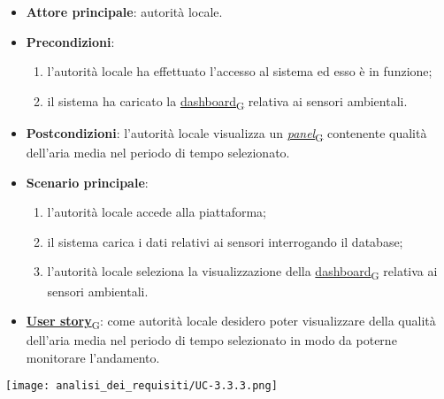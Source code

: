 \begin{itemize}
	\item \textbf{Attore principale}: autorità locale.
	\item \textbf{Precondizioni}:
	      \begin{enumerate}
		      \item l'autorità locale ha effettuato l'accesso al sistema ed esso è in funzione;
		      \item il sistema ha caricato la \href{https://7last.github.io/docs/pb/documentazione-interna/glossario\#dashboard}{dashboard\textsubscript{G}} relativa ai sensori ambientali.
	      \end{enumerate}
	\item \textbf{Postcondizioni}: l'autorità locale visualizza un \href{https://7last.github.io/docs/pb/documentazione-interna/glossario\#panel}{\textit{panel}\textsubscript{G}} contenente qualità dell'aria media nel periodo di tempo selezionato.
	\item \textbf{Scenario principale}:
	      \begin{enumerate}
		      \item l'autorità locale accede alla piattaforma;
		      \item il sistema carica i dati relativi ai sensori interrogando il database;
		      \item l'autorità locale seleziona la visualizzazione della \href{https://7last.github.io/docs/pb/documentazione-interna/glossario\#dashboard}{dashboard\textsubscript{G}} relativa ai sensori ambientali.
	      \end{enumerate}
	\item \href{https://7last.github.io/docs/pb/documentazione-interna/glossario\#user-story}{\textbf{User story}\textsubscript{G}}: come autorità locale desidero poter visualizzare della qualità dell'aria media nel periodo di tempo selezionato
	      in modo da poterne monitorare l'andamento.
\end{itemize}
\begin{center}
	\texttt{[image: analisi\_dei\_requisiti/UC-3.3.3.png]}
\end{center}


